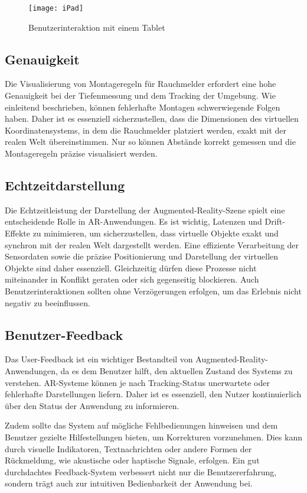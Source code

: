 \begin{figure}[ht]
    \centering
    \texttt{[image: iPad]}
    \caption{Benutzerinteraktion mit einem Tablet}
    \label{fig:ipad}
\end{figure}

\subsection{Genauigkeit}

Die Visualisierung von Montageregeln für Rauchmelder erfordert eine hohe Genauigkeit bei der Tiefenmessung und dem Tracking der Umgebung. Wie einleitend beschrieben, können fehlerhafte Montagen schwerwiegende Folgen haben. Daher ist es essenziell sicherzustellen, dass die Dimensionen des virtuellen Koordinatensystems, in dem die Rauchmelder platziert werden, exakt mit der realen Welt übereinstimmen. Nur so können Abstände korrekt gemessen und die Montageregeln präzise visualisiert werden.

\subsection{Echtzeitdarstellung}

Die Echtzeitleistung der Darstellung der Augmented-Reality-Szene spielt eine entscheidende Rolle in AR-Anwendungen. Es ist wichtig, Latenzen und Drift-Effekte zu minimieren, um sicherzustellen, dass virtuelle Objekte exakt und synchron mit der realen Welt dargestellt werden. Eine effiziente Verarbeitung der Sensordaten sowie die präzise Positionierung und Darstellung der virtuellen Objekte sind daher essenziell. Gleichzeitig dürfen diese Prozesse nicht miteinander in Konflikt geraten oder sich gegenseitig blockieren. Auch Benutzerinteraktionen sollten ohne Verzögerungen erfolgen, um das Erlebnis nicht negativ zu beeinflussen.

\subsection{Benutzer-Feedback}

Das User-Feedback ist ein wichtiger Bestandteil von Augmented-Reality-Anwendungen, da es dem Benutzer hilft, den aktuellen Zustand des Systems zu verstehen. AR-Systeme können je nach Tracking-Status unerwartete oder fehlerhafte Darstellungen liefern. Daher ist es essenziell, den Nutzer kontinuierlich über den Status der Anwendung zu informieren.

Zudem sollte das System auf mögliche Fehlbedienungen hinweisen und dem Benutzer gezielte Hilfestellungen bieten, um Korrekturen vorzunehmen. Dies kann durch visuelle Indikatoren, Textnachrichten oder andere Formen der Rückmeldung, wie akustische oder haptische Signale, erfolgen. Ein gut durchdachtes Feedback-System verbessert nicht nur die Benutzererfahrung, sondern trägt auch zur intuitiven Bedienbarkeit der Anwendung bei.

